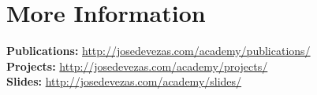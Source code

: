 \documentclass{friggeri-cv}
\begin{document}

\section{More Information}

\textbf{Publications:} \url{http://josedevezas.com/academy/publications/}\\
\textbf{Projects:} \url{http://josedevezas.com/academy/projects/}\\
\textbf{Slides:} \url{http://josedevezas.com/academy/slides/}
\end{document}

